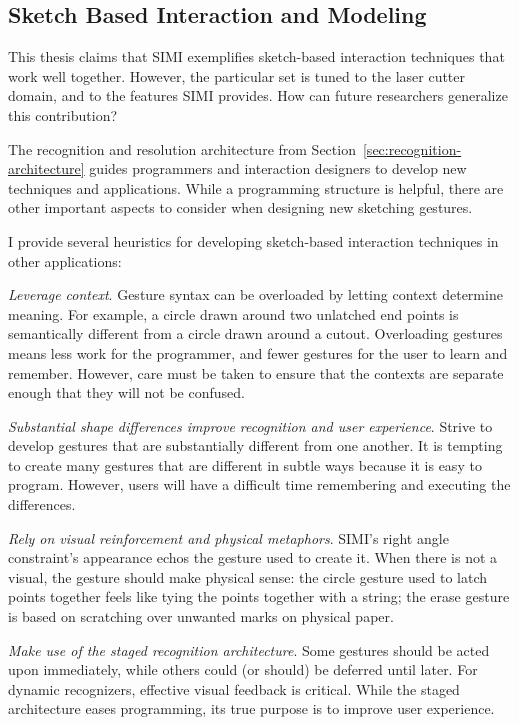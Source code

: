 \subsection{Sketch Based Interaction and Modeling}

This thesis claims that SIMI exemplifies sketch-based interaction
techniques that work well together. However, the particular set is
tuned to the laser cutter domain, and to the features SIMI
provides. How can future researchers generalize this contribution?

The recognition and resolution architecture from
Section~\ref{sec:recognition-architecture} guides programmers and
interaction designers to develop new techniques and
applications. While a programming structure is helpful, there are
other important aspects to consider when designing new sketching
gestures.

I provide several heuristics for developing sketch-based interaction
techniques in other applications:

\textit{Leverage context}. Gesture syntax can be overloaded by letting
context determine meaning. For example, a circle drawn around two
unlatched end points is semantically different from a circle drawn
around a cutout. Overloading gestures means less work for the
programmer, and fewer gestures for the user to learn and
remember. However, care must be taken to ensure that the contexts are
separate enough that they will not be confused.

\textit{Substantial shape differences improve recognition and user
  experience}. Strive to develop gestures that are substantially
different from one another. It is tempting to create many gestures
that are different in subtle ways because it is easy to
program. However, users will have a difficult time remembering and
executing the differences.

\textit{Rely on visual reinforcement and physical metaphors}. SIMI's
right angle constraint's appearance echos the gesture used to create
it. When there is not a visual, the gesture should make physical
sense: the circle gesture used to latch points together feels like
tying the points together with a string; the erase gesture is based on
scratching over unwanted marks on physical paper.

\textit{Make use of the staged recognition architecture}. Some
gestures should be acted upon immediately, while others could (or
should) be deferred until later. For dynamic recognizers, effective
visual feedback is critical. While the staged architecture eases
programming, its true purpose is to improve user experience.


